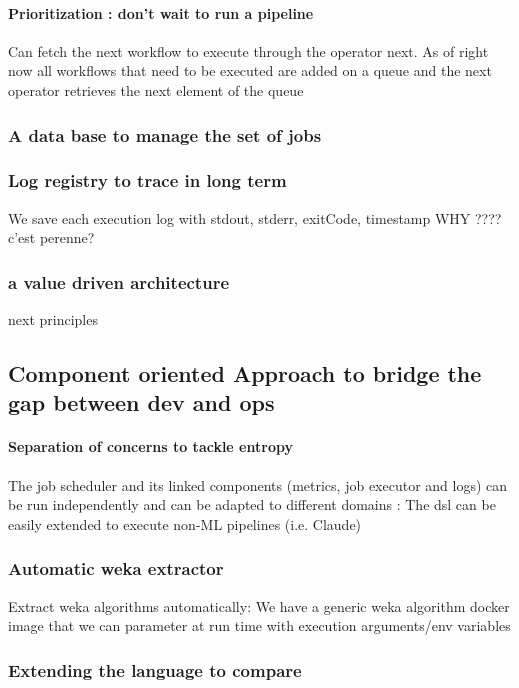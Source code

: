 \documentclass{llncs}
\newcommand{\comment}[4]{\par\noindent\hspace*{-0.5cm}{\parbox{\columnwidth}{\textbf{\color{#1}//#2[#3]:#4}}}\par}
\newcommand{\rmk}[1]{\comment{green}{}{#1}{TH}}
\begin{document}
\paragraph{Prioritization  : don't wait to run a pipeline }
Can fetch the next workflow to execute through the operator next. As of right now all workflows that need to be executed are added on a queue and the next operator retrieves the next element of the queue

\subsubsection{A data base to manage the set of jobs}
\subsubsection{Log registry to trace in long term}
We save each execution log with stdout, stderr, exitCode, timestamp
WHY ???? c'est perenne?
\subsubsection{a value driven architecture}
next principles







\subsection{Component oriented Approach to bridge the gap between dev and ops}
\paragraph{Separation of concerns to tackle entropy}
The job scheduler and its linked components (metrics, job executor and logs) can be run independently and can be adapted to different domains :
The dsl can be easily extended to execute non-ML pipelines (i.e. Claude)\rmk{je le dirai pas}

\subsubsection{Automatic weka extractor}
Extract weka algorithms automatically: We have a generic weka algorithm docker image that we can parameter at run time with execution arguments/env variables

\subsubsection{Extending the language to compare}
\end{document}
